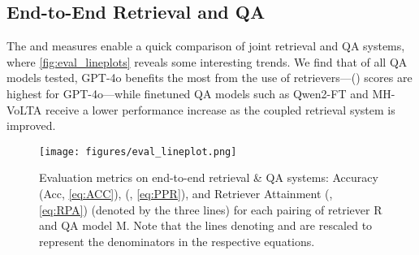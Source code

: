 
    

\subsection{End-to-End Retrieval and QA}
The \PPR and \RPA measures enable a quick comparison of joint retrieval and QA systems, where \autoref{fig:eval_lineplots} reveals some interesting trends. We find that of all QA models tested, GPT-4o benefits the most from the use of retrievers---\rpa (\RPA) scores are highest for GPT-4o---while finetuned QA models such as Qwen2-FT and MH-VoLTA receive a lower performance increase as the coupled retrieval system is improved.

\begin{figure}
    \centering
    \texttt{[image: figures/eval\_lineplot.png]}
    \caption{Evaluation metrics on end-to-end retrieval \& QA systems: Accuracy (Acc, \autoref{eq:ACC}), \ppr (\PPR, \autoref{eq:PPR}), and Retriever Attainment (\RPA, \autoref{eq:RPA}) (denoted by the three lines) for each pairing of retriever R and QA model M. Note that the lines denoting \PPR and \RPA are rescaled to represent the denominators in the respective equations. }
    \label{fig:eval_lineplots}
\end{figure}

